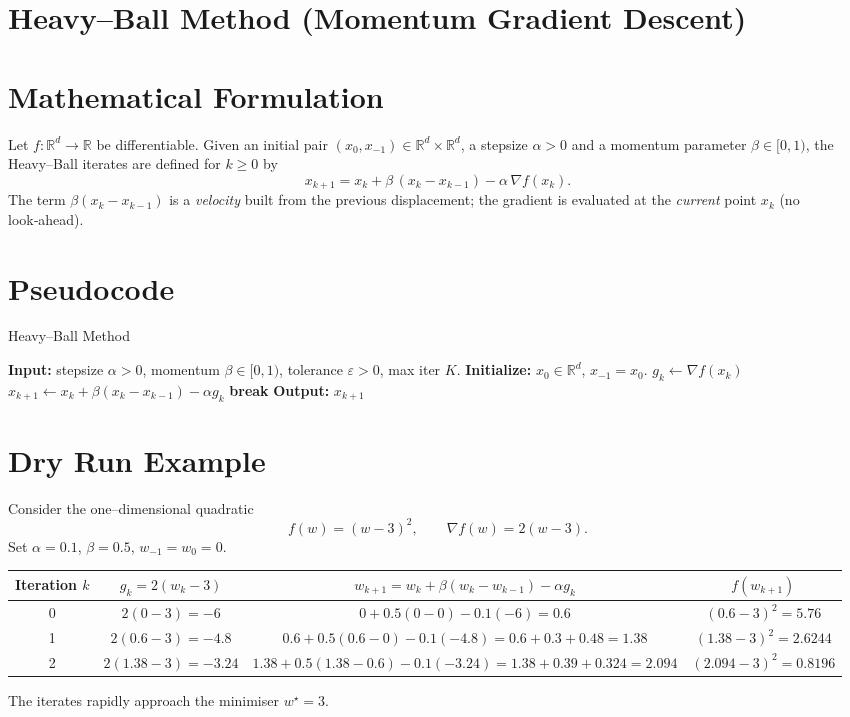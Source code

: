 \documentclass{article}
\newcommand{\grad}{\nabla}
\begin{document}
\section*{Heavy–Ball Method (Momentum Gradient Descent)}

\section*{Mathematical Formulation}
Let $f:\mathbb{R}^d\to\mathbb{R}$ be differentiable.  
Given an initial pair $(x_0,x_{-1})\in\mathbb{R}^d\times\mathbb{R}^d$, a stepsize $\alpha>0$ and a momentum parameter $\beta\in[0,1)$, the Heavy–Ball iterates are defined for $k\ge 0$ by
\begin{equation}
\boxed{
x_{k+1}=x_k+\beta\,(x_k-x_{k-1})-\alpha\,\grad f(x_k).
}
\label{eq:HB}
\end{equation}
The term $\beta(x_k-x_{k-1})$ is a \emph{velocity} built from the previous displacement; the gradient is evaluated at the \emph{current} point $x_k$ (no look‑ahead).

\section*{Pseudocode}
\begin{algorithm}[H]
\caption{Heavy–Ball Method}
\begin{algorithmic}[1]
\State \textbf{Input:} stepsize $\alpha>0$, momentum $\beta\in[0,1)$, tolerance $\varepsilon>0$, max iter $K$.
\State \textbf{Initialize:} $x_0\in\mathbb{R}^d$, $x_{-1}=x_0$.
    \State $g_k\gets \grad f(x_k)$
    \State $x_{k+1}\gets x_k+\beta (x_k-x_{k-1})-\alpha g_k$
        \State \textbf{break}
    \EndIf
\EndFor
\State \textbf{Output:} $x_{k+1}$
\end{algorithmic}
\end{algorithm}

\section*{Dry Run Example}
Consider the one–dimensional quadratic
\[
f(w)=(w-3)^2,
\qquad \grad f(w)=2(w-3).
\]
Set $\alpha=0.1$, $\beta=0.5$, $w_{-1}=w_0=0$.

\begin{center}
\begin{tabular}{c|c|c|c}
Iteration $k$ & $g_k=2(w_k-3)$ & $w_{k+1}=w_k+\beta(w_k-w_{k-1})-\alpha g_k$ & $f(w_{k+1})$ \\ \hline
0 & $2(0-3)=-6$ & $0+0.5(0-0)-0.1(-6)=0.6$ & $(0.6-3)^2=5.76$ \\
1 & $2(0.6-3)=-4.8$ & $0.6+0.5(0.6-0)-0.1(-4.8)=0.6+0.3+0.48=1.38$ & $(1.38-3)^2=2.6244$ \\
2 & $2(1.38-3)=-3.24$ & $1.38+0.5(1.38-0.6)-0.1(-3.24)=1.38+0.39+0.324=2.094$ & $(2.094-3)^2=0.8196$
\end{tabular}
\end{center}
The iterates rapidly approach the minimiser $w^\star=3$.
\end{document}

